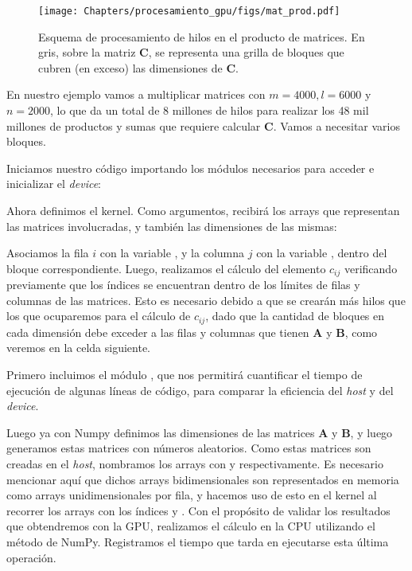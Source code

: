 \begin{figure}
    \begin{center}
        \texttt{[image: Chapters/procesamiento\_gpu/figs/mat\_prod.pdf]}
        \caption{Esquema de procesamiento de hilos en el producto de matrices. En gris, sobre la matriz $\bm{C}$, se representa una grilla de bloques que cubren (en exceso) las dimensiones de $\bm{C}$.}
        \label{fig:matp1}
    \end{center}
\end{figure}

En nuestro ejemplo vamos a multiplicar matrices con $m = 4000, l = 6000$ y $n = 2000$, lo que da un total de 8 millones de hilos para realizar los 48 mil millones de productos y sumas que requiere calcular $\bm{C}$. Vamos a necesitar varios bloques.

Iniciamos nuestro código importando los módulos necesarios para acceder e inicializar el \textit{device}:


Ahora definimos el kernel. Como argumentos, recibirá los arrays que representan las matrices involucradas, y también las dimensiones de las mismas:


Asociamos la fila $i$ con la variable , y la columna $j$ con la variable , dentro del bloque correspondiente. Luego, realizamos el cálculo del elemento $c_{ij}$ verificando previamente que los índices se encuentran dentro de los límites de filas y columnas de las matrices. Esto es necesario debido a que se crearán más hilos que los que ocuparemos para el cálculo de $c_{ij}$, dado que la cantidad de bloques en cada dimensión debe exceder a las filas y columnas que tienen $\bm{A}$ y $\bm{B}$, como veremos en la celda siguiente.

Primero incluimos el módulo , que nos permitirá cuantificar el tiempo de ejecución de algunas líneas de código, para comparar la eficiencia del \textit{host} y del \textit{device}.

Luego ya con Numpy definimos las dimensiones de las matrices $\bm{A}$ y $\bm{B}$, y luego generamos estas matrices con números aleatorios. Como estas matrices son creadas en el \textit{host}, nombramos los arrays con  y  respectivamente. Es necesario mencionar aquí que dichos arrays bidimensionales son representados en memoria como arrays unidimensionales por fila, y hacemos uso de esto en el kernel al recorrer los arrays con los índices  y . Con el propósito de validar los resultados que obtendremos con la GPU, realizamos el cálculo en la CPU utilizando el método  de NumPy. Registramos el tiempo que tarda en ejecutarse esta última operación.

